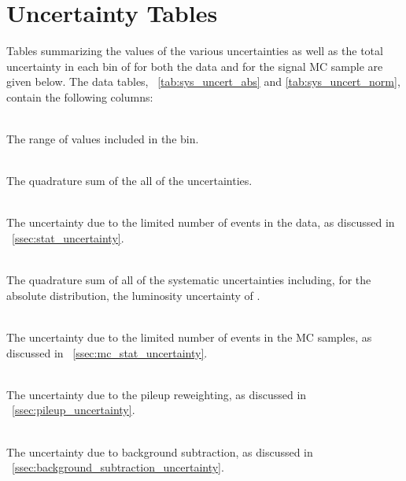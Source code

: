 
\section{Uncertainty Tables}

Tables summarizing the values of the various uncertainties as well as the total
uncertainty in each bin of \phistar for both the data and for the \MADGRAPH
signal MC sample are given below. The data tables,
\TABS~\ref{tab:sys_uncert_abs} and \ref{tab:sys_uncert_norm}, contain the
following columns:

\begin{description}[noitemsep]

    \item[\phistar Range:] \hfill \\
        The range of \phistar values included in the bin.

    \item[Total Uncertainty (Total):] \hfill \\
        The quadrature sum of the all of the uncertainties.

    \item[Statistical Uncertainty (Stat.):] \hfill \\
        The uncertainty due to the limited number of events in the data, as
        discussed in \SEC~\ref{ssec:stat_uncertainty}.

    \item[Total Systematic Uncertainty (Total Syst.):] \hfill \\
        The quadrature sum of all of the systematic uncertainties including,
        for the absolute distribution, the luminosity uncertainty of
        \LumiUncertainty.

    \item[Monte Carlo Statistical Uncertainty (MC Stat.):] \hfill \\
        The uncertainty due to the limited number of events in the MC samples,
        as discussed in \SEC~\ref{ssec:mc_stat_uncertainty}.

    \item[Pileup Uncertainty (Pileup):] \hfill \\
        The uncertainty due to the pileup reweighting, as discussed in
        \SEC~\ref{ssec:pileup_uncertainty}.

    \item[Background Subtraction Uncertainty (Bkg.):] \hfill \\
        The uncertainty due to background subtraction, as discussed in
        \SEC~\ref{ssec:background_subtraction_uncertainty}.


\end{description}
